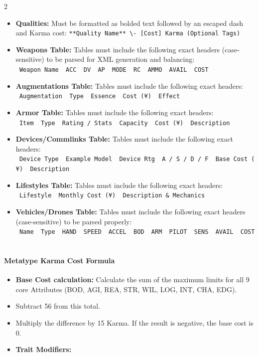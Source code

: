 \documentclass[
  oneside]{article}
\providecommand{\tightlist}{%
  \setlength{\itemsep}{0pt}\setlength{\parskip}{0pt}}
\begin{document}
\begin{multicols}{2}
\begin{itemize}
\tightlist
\item
  \textbf{Qualities:} Must be formatted as bolded
  text followed by an escaped dash and Karma cost:
  \texttt{**Quality\ Name**\ \textbackslash{}-\ {[}Cost{]}\ Karma\ (Optional\ Tags)}
\item
  \textbf{Weapons Table:} Tables must include the
  following exact headers (case-sensitive) to be
  parsed for XML generation and balancing:
  \texttt{\textbar{}\ Weapon\ Name\ \textbar{}\ ACC\ \textbar{}\ DV\ \textbar{}\ AP\ \textbar{}\ MODE\ \textbar{}\ RC\ \textbar{}\ AMMO\ \textbar{}\ AVAIL\ \textbar{}\ COST\ \textbar{}}
\item
  \textbf{Augmentations Table:} Tables must
  include the following exact headers:
  \texttt{\textbar{}\ Augmentation\ \textbar{}\ Type\ \textbar{}\ Essence\ \textbar{}\ Cost\ (¥)\ \textbar{}\ Effect\ \textbar{}}
\item
  \textbf{Armor Table:} Tables must include the
  following exact headers:
  \texttt{\textbar{}\ Item\ \textbar{}\ Type\ \textbar{}\ Rating\ /\ Stats\ \textbar{}\ Capacity\ \textbar{}\ Cost\ (¥)\ \textbar{}\ Description\ \textbar{}}
\item
  \textbf{Devices/Commlinks Table:} Tables must
  include the following exact headers:
  \texttt{\textbar{}\ Device\ Type\ \textbar{}\ Example\ Model\ \textbar{}\ Device\ Rtg\ \textbar{}\ A\ /\ S\ /\ D\ /\ F\ \textbar{}\ Base\ Cost\ (¥)\ \textbar{}\ Description\ \textbar{}}
\item
  \textbf{Lifestyles Table:} Tables must include
  the following exact headers:
  \texttt{\textbar{}\ Lifestyle\ \textbar{}\ Monthly\ Cost\ (¥)\ \textbar{}\ Description\ \&\ Mechanics\ \textbar{}}
\item
  \textbf{Vehicles/Drones Table:} Tables must
  include the following exact headers
  (case-sensitive) to be parsed properly:
  \texttt{\textbar{}\ Name\ \textbar{}\ Type\ \textbar{}\ HAND\ \textbar{}\ SPEED\ \textbar{}\ ACCEL\ \textbar{}\ BOD\ \textbar{}\ ARM\ \textbar{}\ PILOT\ \textbar{}\ SENS\ \textbar{}\ AVAIL\ \textbar{}\ COST\ \textbar{}}
\end{itemize}

\hypertarget{metatype-karma-cost-formula}{%
\paragraph{Metatype Karma Cost
Formula}\label{metatype-karma-cost-formula}}

\begin{itemize}
\tightlist
\item
  \textbf{Base Cost calculation:} Calculate the
  sum of the maximum limits for all 9 core
  Attributes (BOD, AGI, REA, STR, WIL, LOG, INT,
  CHA, EDG).
\item
  Subtract 56 from this total.
\item
  Multiply the difference by 15 Karma. If the
  result is negative, the base cost is 0.
\item
  \textbf{Trait Modifiers:}


\end{itemize}
\end{multicols}
\end{document}
